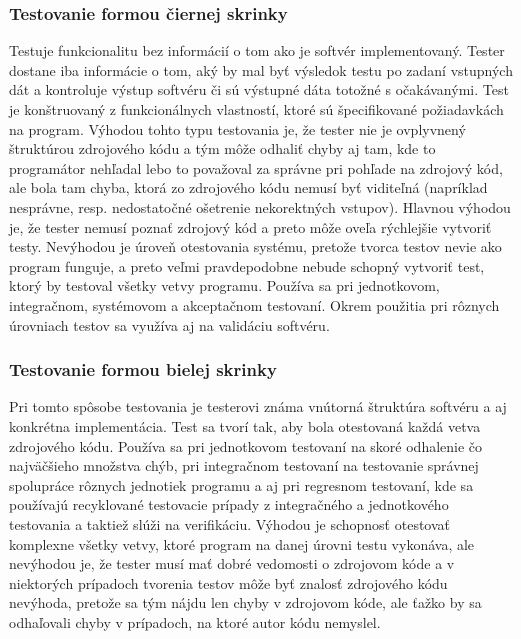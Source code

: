 \documentclass[11pt,twoside,slovak,a4paper]{article}
\begin{document}
		\subsubsection{Testovanie formou čiernej skrinky} 
			Testuje funkcionalitu bez informácií o tom ako je softvér implementovaný. Tester dostane iba informácie o tom, aký by mal byť výsledok testu po zadaní vstupných dát a kontroluje výstup softvéru či sú výstupné dáta totožné s očakávanými\cite{EST2002}. Test je konštruovaný z funkcionálnych vlastností, ktoré sú špecifikované požiadavkách na program\cite{Moha1991}.  Výhodou tohto typu testovania je, že tester nie je ovplyvnený štruktúrou zdrojového kódu a tým môže odhaliť chyby aj tam, kde to programátor nehľadal lebo to považoval za správne pri pohľade na zdrojový kód, ale bola tam chyba, ktorá zo zdrojového kódu nemusí byť viditeľná (napríklad nesprávne, resp. nedostatočné ošetrenie nekorektných vstupov). Hlavnou výhodou je, že tester nemusí poznať zdrojový kód a preto môže oveľa rýchlejšie vytvoriť testy. Nevýhodou je úroveň otestovania systému, pretože tvorca testov nevie ako program funguje, a preto veľmi pravdepodobne nebude schopný vytvoriť test, ktorý by testoval všetky vetvy programu. Používa sa pri jednotkovom, integračnom, systémovom a akceptačnom testovaní. Okrem použitia pri rôznych úrovniach testov sa využíva aj na validáciu softvéru\cite{EST2002}.
		\subsubsection{Testovanie formou bielej skrinky} 
			Pri tomto spôsobe testovania je testerovi známa vnútorná štruktúra softvéru a aj konkrétna implementácia. Test sa tvorí tak, aby bola otestovaná každá vetva zdrojového kódu\cite{EST2002}. Používa sa pri jednotkovom testovaní na skoré odhalenie čo najväčšieho množstva chýb, pri integračnom testovaní na testovanie správnej spolupráce rôznych jednotiek programu a aj pri regresnom testovaní, kde sa používajú recyklované testovacie prípady z integračného a jednotkového testovania a taktiež slúži na verifikáciu. Výhodou je schopnosť otestovať komplexne všetky vetvy, ktoré program na danej úrovni testu vykonáva, ale nevýhodou je, že tester musí mať dobré vedomosti o zdrojovom kóde a v niektorých prípadoch tvorenia testov môže byť znalosť zdrojového kódu nevýhoda, pretože sa tým nájdu len chyby v zdrojovom kóde, ale ťažko by sa odhaľovali chyby v prípadoch, na ktoré autor kódu nemyslel.
\end{document}
